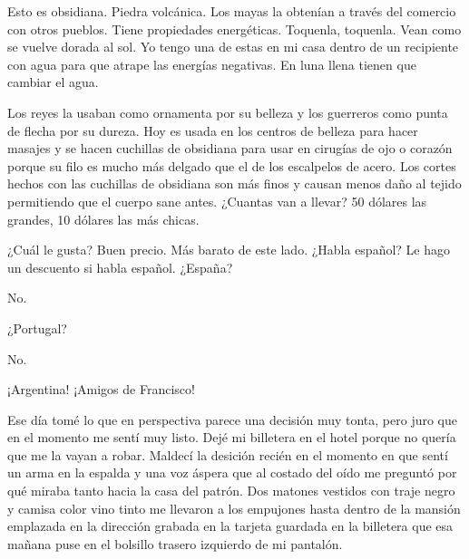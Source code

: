 \documentclass[12pt,twoside,openright,a5paper]{book}
\begin{document}
\vspace{0.5cm}
\hrulefill\hspace{0.2cm} \decofourleft\decofourright \hspace{0.2cm} \hrulefill
\vspace{0.5cm}

Esto es obsidiana. Piedra volcánica. Los mayas la obtenían a través
del comercio con otros pueblos. Tiene propiedades energéticas. Toquenla,
toquenla. Vean como se vuelve dorada al sol. Yo tengo una de estas en
mi casa dentro de un recipiente con agua para que atrape las energías
negativas. En luna llena tienen que cambiar el agua.

Los reyes la usaban como ornamenta por su belleza y los guerreros como punta
de flecha por su dureza. Hoy es usada en los centros de belleza para hacer
masajes y se hacen cuchillas de obsidiana para usar en cirugías de ojo o
corazón porque su filo es mucho más delgado que el de los escalpelos de
acero. Los cortes hechos con las cuchillas de obsidiana son más finos y
causan menos daño al tejido permitiendo que el cuerpo sane antes. ¿Cuantas
van a llevar? 50 dólares las grandes, 10 dólares las más chicas.


\vspace{0.5cm}
\hrulefill\hspace{0.2cm} \decofourleft\decofourright \hspace{0.2cm} \hrulefill
\vspace{0.5cm}

¿Cuál le gusta? Buen precio. Más barato de este lado. ¿Habla español? Le
hago un descuento si habla español. ¿España?

No.

¿Portugal?

No.

¡Argentina! ¡Amigos de Francisco!


\vspace{0.5cm}
\hrulefill\hspace{0.2cm} \decofourleft\decofourright \hspace{0.2cm} \hrulefill
\vspace{0.5cm}

Ese día tomé lo que en perspectiva parece una decisión muy tonta, pero
juro que en el momento me sentí muy listo. Dejé mi billetera en el hotel
porque no quería que me la vayan a robar. Maldecí la desición recién
en el momento en que sentí un arma en la espalda y una voz áspera que
al costado del oído me preguntó por qué miraba tanto hacia la casa del
patrón. Dos matones vestidos con traje negro y camisa color vino tinto
me llevaron a los empujones hasta dentro de la mansión emplazada en la
dirección grabada en la tarjeta guardada en la billetera que esa mañana
puse en el bolsillo trasero izquierdo de mi pantalón.
\end{document}
